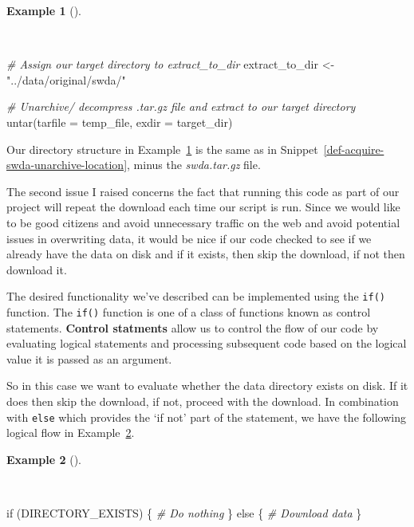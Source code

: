 \documentclass[
  letterpaper,
  krantz1]{latex/krantz-mod}
\newenvironment{Shaded}{\begin{snugshade}}{\end{snugshade}}
\newcommand{\AttributeTok}[1]{\textcolor[rgb]{0.00,0.00,0.00}{#1}}
\newcommand{\CommentTok}[1]{\textcolor[rgb]{0.00,0.00,0.00}{\textit{#1}}}
\newcommand{\ControlFlowTok}[1]{\textcolor[rgb]{0.00,0.00,0.00}{#1}}
\newcommand{\FunctionTok}[1]{\textcolor[rgb]{0.00,0.00,0.00}{#1}}
\newcommand{\NormalTok}[1]{\textcolor[rgb]{0.00,0.00,0.00}{#1}}
\newcommand{\OtherTok}[1]{\textcolor[rgb]{0.00,0.00,0.00}{#1}}
\newcommand{\StringTok}[1]{\textcolor[rgb]{0.00,0.00,0.00}{#1}}
\theoremstyle{definition}
\newtheorem{example}{Example}[chapter]
\theoremstyle{definition}
\theoremstyle{remark}
\begin{document}
\begin{example}[]\protect\hypertarget{exm-acquire-swda-untar-temp}{}\label{exm-acquire-swda-untar-temp}

~

\begin{Shaded}
\begin{Highlighting}[numbers=left,,]
\CommentTok{\# Assign our target directory to \textasciigrave{}extract\_to\_dir\textasciigrave{}}
\NormalTok{extract\_to\_dir }\OtherTok{\textless{}{-}} \StringTok{"../data/original/swda/"}

\CommentTok{\# Unarchive/ decompress .tar.gz file and extract to our target directory}
\FunctionTok{untar}\NormalTok{(}\AttributeTok{tarfile =}\NormalTok{ temp\_file, }\AttributeTok{exdir =}\NormalTok{ target\_dir)}
\end{Highlighting}
\end{Shaded}

\end{example}

Our directory structure in Example~\ref{exm-acquire-swda-untar-temp} is
the same as in Snippet~\ref{def-acquire-swda-unarchive-location}, minus
the \emph{swda.tar.gz} file.

The second issue I raised concerns the fact that running this code as
part of our project will repeat the download each time our script is
run. Since we would like to be good citizens and avoid unnecessary
traffic on the web and avoid potential issues in overwriting data, it
would be nice if our code checked to see if we already have the data on
disk and if it exists, then skip the download, if not then download it.

The desired functionality we've described can be implemented using the
\texttt{if()} function. The \texttt{if()} function is one of a class of
functions known as control statements. \textbf{Control statments} allow
us to control the flow of our code by evaluating logical statements and
processing subsequent code based on the logical value it is passed as an
argument.

So in this case we want to evaluate whether the data directory exists on
disk. If it does then skip the download, if not, proceed with the
download. In combination with \texttt{else} which provides the `if not'
part of the statement, we have the following logical flow in
Example~\ref{exm-acquire-if-dir-exists}.

\begin{example}[]\protect\hypertarget{exm-acquire-if-dir-exists}{}\label{exm-acquire-if-dir-exists}

~

\begin{Shaded}
\begin{Highlighting}[numbers=left,,]
\ControlFlowTok{if}\NormalTok{ (DIRECTORY\_EXISTS) \{}
  \CommentTok{\# Do nothing}
\NormalTok{\} }\ControlFlowTok{else}\NormalTok{ \{}
  \CommentTok{\# Download data}
\NormalTok{\}}
\end{Highlighting}
\end{Shaded}

\end{example}
\end{document}
